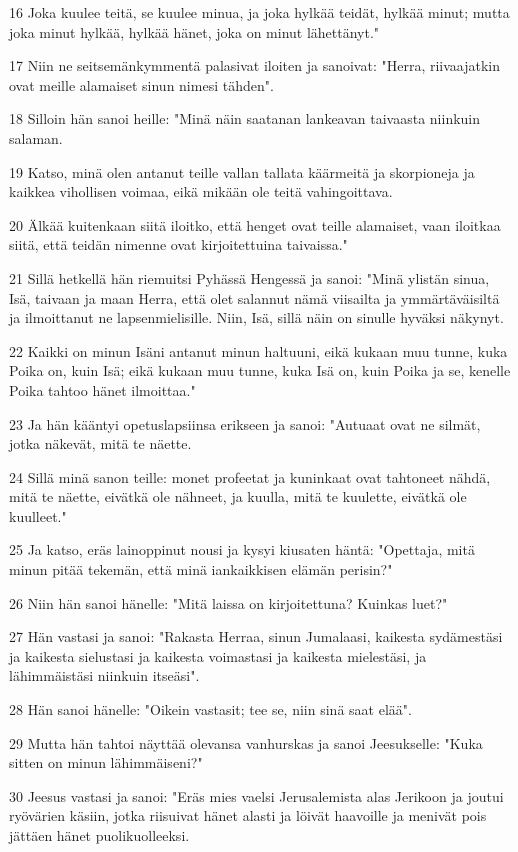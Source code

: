 \par 16 Joka kuulee teitä, se kuulee minua, ja joka hylkää teidät, hylkää minut; mutta joka minut hylkää, hylkää hänet, joka on minut lähettänyt."
\par 17 Niin ne seitsemänkymmentä palasivat iloiten ja sanoivat: "Herra, riivaajatkin ovat meille alamaiset sinun nimesi tähden".
\par 18 Silloin hän sanoi heille: "Minä näin saatanan lankeavan taivaasta niinkuin salaman.
\par 19 Katso, minä olen antanut teille vallan tallata käärmeitä ja skorpioneja ja kaikkea vihollisen voimaa, eikä mikään ole teitä vahingoittava.
\par 20 Älkää kuitenkaan siitä iloitko, että henget ovat teille alamaiset, vaan iloitkaa siitä, että teidän nimenne ovat kirjoitettuina taivaissa."
\par 21 Sillä hetkellä hän riemuitsi Pyhässä Hengessä ja sanoi: "Minä ylistän sinua, Isä, taivaan ja maan Herra, että olet salannut nämä viisailta ja ymmärtäväisiltä ja ilmoittanut ne lapsenmielisille. Niin, Isä, sillä näin on sinulle hyväksi näkynyt.
\par 22 Kaikki on minun Isäni antanut minun haltuuni, eikä kukaan muu tunne, kuka Poika on, kuin Isä; eikä kukaan muu tunne, kuka Isä on, kuin Poika ja se, kenelle Poika tahtoo hänet ilmoittaa."
\par 23 Ja hän kääntyi opetuslapsiinsa erikseen ja sanoi: "Autuaat ovat ne silmät, jotka näkevät, mitä te näette.
\par 24 Sillä minä sanon teille: monet profeetat ja kuninkaat ovat tahtoneet nähdä, mitä te näette, eivätkä ole nähneet, ja kuulla, mitä te kuulette, eivätkä ole kuulleet."
\par 25 Ja katso, eräs lainoppinut nousi ja kysyi kiusaten häntä: "Opettaja, mitä minun pitää tekemän, että minä iankaikkisen elämän perisin?"
\par 26 Niin hän sanoi hänelle: "Mitä laissa on kirjoitettuna? Kuinkas luet?"
\par 27 Hän vastasi ja sanoi: "Rakasta Herraa, sinun Jumalaasi, kaikesta sydämestäsi ja kaikesta sielustasi ja kaikesta voimastasi ja kaikesta mielestäsi, ja lähimmäistäsi niinkuin itseäsi".
\par 28 Hän sanoi hänelle: "Oikein vastasit; tee se, niin sinä saat elää".
\par 29 Mutta hän tahtoi näyttää olevansa vanhurskas ja sanoi Jeesukselle: "Kuka sitten on minun lähimmäiseni?"
\par 30 Jeesus vastasi ja sanoi: "Eräs mies vaelsi Jerusalemista alas Jerikoon ja joutui ryövärien käsiin, jotka riisuivat hänet alasti ja löivät haavoille ja menivät pois jättäen hänet puolikuolleeksi.
